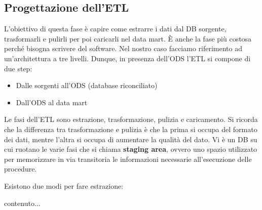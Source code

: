 \subsection{Progettazione dell'ETL}
L’obiettivo di questa fase è capire come estrarre i dati dal DB sorgente, trasformarli e pulirli per poi caricarli nel data mart. È anche la fase più costosa perché bisogna scrivere del software. Nel nostro caso facciamo riferimento ad un’architettura a tre livelli. Dunque, in presenza dell’ODS l’ETL si compone di due step:
\begin{itemize}
	\item 
	Dalle sorgenti all’ODS (database riconciliato)
	\item 
	Dall’ODS al data mart
\end{itemize}
Le fasi dell’ETL sono estrazione, trasformazione, pulizia e caricamento. Si ricorda che la differenza tra trasformazione e pulizia è che la prima si occupa del formato dei dati, mentre l'altra si occupa di aumentare la qualità del dato. Vi è un DB su cui ruotano le varie fasi che si chiama \textbf{staging area}, ovvero uno spazio utilizzato per memorizzare in via transitoria le informazioni necessarie all’esecuzione delle procedure.

Esistono due modi per fare estrazione:
\begin{itemize}
	contenuto...
\end{itemize}